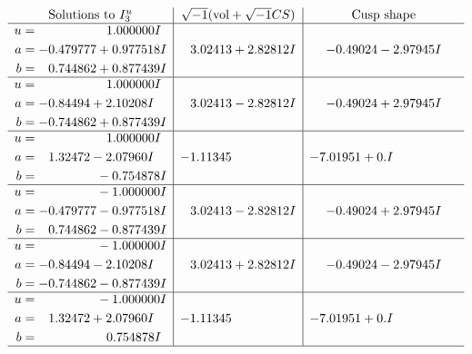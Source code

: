 \documentclass[1p]{elsarticle_modified}
\theoremstyle{definition}
\newcommand{\I}{\sqrt{-1}}
\begin{document}
$$\begin{array}{c|c|c}  
\text{Solutions to }I^u_{3}& \I (\text{vol} + \sqrt{-1}CS) & \text{Cusp shape}\\
 \hline 
\begin{aligned}
u &= \phantom{-0.000000 -}1.000000 I \\
a &= -0.479777 + 0.977518 I \\
b &= \phantom{-}0.744862 + 0.877439 I\end{aligned}
 & \phantom{-}3.02413 + 2.82812 I & -0.49024 - 2.97945 I \\ \hline\begin{aligned}
u &= \phantom{-0.000000 -}1.000000 I \\
a &= -0.84494 + 2.10208 I \\
b &= -0.744862 + 0.877439 I\end{aligned}
 & \phantom{-}3.02413 - 2.82812 I & -0.49024 + 2.97945 I \\ \hline\begin{aligned}
u &= \phantom{-0.000000 -}1.000000 I \\
a &= \phantom{-}1.32472 - 2.07960 I \\
b &= \phantom{-0.000000 } -0.754878 I\end{aligned}
 & -1.11345\phantom{ +0.000000I} & -7.01951 + 0. I\phantom{ +0.000000I} \\ \hline\begin{aligned}
u &= \phantom{-0.000000 } -1.000000 I \\
a &= -0.479777 - 0.977518 I \\
b &= \phantom{-}0.744862 - 0.877439 I\end{aligned}
 & \phantom{-}3.02413 - 2.82812 I & -0.49024 + 2.97945 I \\ \hline\begin{aligned}
u &= \phantom{-0.000000 } -1.000000 I \\
a &= -0.84494 - 2.10208 I \\
b &= -0.744862 - 0.877439 I\end{aligned}
 & \phantom{-}3.02413 + 2.82812 I & -0.49024 - 2.97945 I \\ \hline\begin{aligned}
u &= \phantom{-0.000000 } -1.000000 I \\
a &= \phantom{-}1.32472 + 2.07960 I \\
b &= \phantom{-0.000000 -}0.754878 I\end{aligned}
 & -1.11345\phantom{ +0.000000I} & -7.01951 + 0. I\phantom{ +0.000000I}\\
 \hline 
 \end{array}$$\newpage
\end{document}
